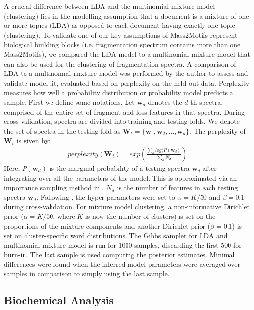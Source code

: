 A crucial difference between LDA and the multinomial mixture-model (clustering) lies in the modelling assumption that a document is a mixture of one or more topics (LDA) as opposed to each document having exactly one topic (clustering). To validate one of our key assumptions of Mass2Motifs represent biological building blocks (i.e. fragmentation spectrum contains more than one Mass2Motifs), we compared the LDA model to a multinomial mixture model that can also be used for the clustering of fragmentation spectra. A comparison of LDA to a multinomial mixture model was performed by the author to assess and validate model fit, evaluated based on perplexity on the held-out data. Perplexity measures how well a probability distribution or probability model predicts a sample. First we define some notations. Let $\boldsymbol{w}_d$ denotes the $d$-th spectra, comprised of the entire set of fragment and loss features in that spectra. During cross-validation, spectra are divided into training and testing folds. We denote the set of spectra in the testing fold as $\boldsymbol{W}_t=\{\boldsymbol{w}_1, \boldsymbol{w}_2, ..., \boldsymbol{w}_d\}$. The perplexity of $\boldsymbol{W}_t$ is given by:
\begin{align*}
perplexity(\boldsymbol{W}_t)=exp\left(\frac{\sum_{d}log(P(\boldsymbol{w}_{d})}{\sum_{d}N_d}\right)
\end{align*}
Here, $P(\boldsymbol{w}_d)$ is the marginal probability of a testing spectra $\boldsymbol{w}_d$ after integrating over all the parameters of the model. This is approximated via an importance sampling method in \cite{wallach2009evaluation}. $N_d$ is the number of features in each testing spectra $\boldsymbol{w}_d$. Following \cite{Griffiths2004}, the hyper-parameters were set to $\alpha=K/50$ and $\beta=0.1$ during cross-validation. For mixture model clustering, a non-informative Dirichlet prior ($\alpha=K/50$, where $K$ is now the number of clusters) is set on the proportions of the mixture components and another Dirichlet prior ($\beta=0.1$) is set on cluster-specific word distributions. The Gibbs sampler for LDA and multinomial mixture model is run for 1000 samples, discarding the first 500 for burn-in. The last sample is used computing the posterior estimates. Minimal differences were found when the inferred model parameters were averaged over samples in comparison to simply using the last sample.

\subsection{Biochemical Analysis}


